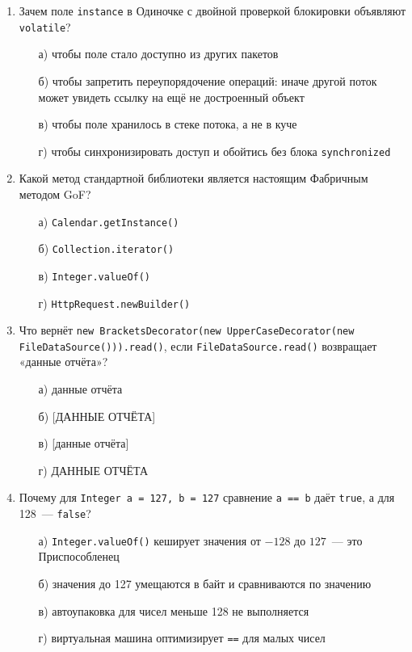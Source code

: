 \begin{enumerate}
\item Зачем поле \texttt{instance} в Одиночке с двойной проверкой блокировки
      объявляют \texttt{volatile}?
  \begin{enumerate}
    \item[а)] чтобы поле стало доступно из других пакетов
    \item[б)] чтобы запретить переупорядочение операций: иначе другой поток
              может увидеть ссылку на ещё не достроенный объект
    \item[в)] чтобы поле хранилось в стеке потока, а не в куче
    \item[г)] чтобы синхронизировать доступ и обойтись без блока
              \texttt{synchronized}
  \end{enumerate}

\item Какой метод стандартной библиотеки является настоящим Фабричным методом
      GoF?
  \begin{enumerate}
    \item[а)] \texttt{Calendar.getInstance()}
    \item[б)] \texttt{Collection.iterator()}
    \item[в)] \texttt{Integer.valueOf()}
    \item[г)] \texttt{HttpRequest.newBuilder()}
  \end{enumerate}

\item Что вернёт \texttt{new BracketsDecorator(new UpperCaseDecorator(new
      FileDataSource())).read()}, если \texttt{FileDataSource.read()}
      возвращает «данные отчёта»?
  \begin{enumerate}
    \item[а)] данные отчёта
    \item[б)] [ДАННЫЕ ОТЧЁТА]
    \item[в)] [данные отчёта]
    \item[г)] ДАННЫЕ ОТЧЁТА
  \end{enumerate}

\item Почему для \texttt{Integer a = 127, b = 127} сравнение \texttt{a == b}
      даёт \texttt{true}, а для 128~--- \texttt{false}?
  \begin{enumerate}
    \item[а)] \texttt{Integer.valueOf()} кеширует значения от $-128$ до
              $127$~--- это Приспособленец
    \item[б)] значения до 127 умещаются в байт и сравниваются по значению
    \item[в)] автоупаковка для чисел меньше 128 не выполняется
    \item[г)] виртуальная машина оптимизирует \texttt{==} для малых чисел
  \end{enumerate}


\end{enumerate}
